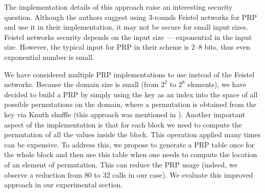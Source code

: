 		The implementation details of this approach raise an interesting security question.
		Although the authors suggest using 3-rounds Feistel networks \cite{unbalanced-feistel} for PRP and use it in their implementation, it may not be secure for small input sizes.
		Feistel networks security depends on the input size \cite{feistel-security} --- exponential in the input size.
		However, the typical input for PRP in their scheme is 2--8 bits, thus even exponential number is small.

		We have considered multiple PRP implementations to use instead of the Feistel networks.
		Because the domain size is small (from $2^2$ to $2^8$ elements), we have decided to build a PRP by simply using the key as an index into the space of all possible permutations on the domain, where a permutation is obtained from the key via Knuth shuffle (this approach was mentioned in \cite{knuth-shuffle-security}).
		Another important aspect of the implementation is that for each block we need to compute the permutation of all the values inside the block.
		This operation applied many times can be expensive.
		To address this, we propose to generate a PRP table once for the whole block and then use this table when one needs to compute the location of an element of permutation.
		This can reduce the PRP usage (indeed, we observe a reduction from 80 to 32 calls in our case).
		We evaluate this improved approach in our experimental section.
